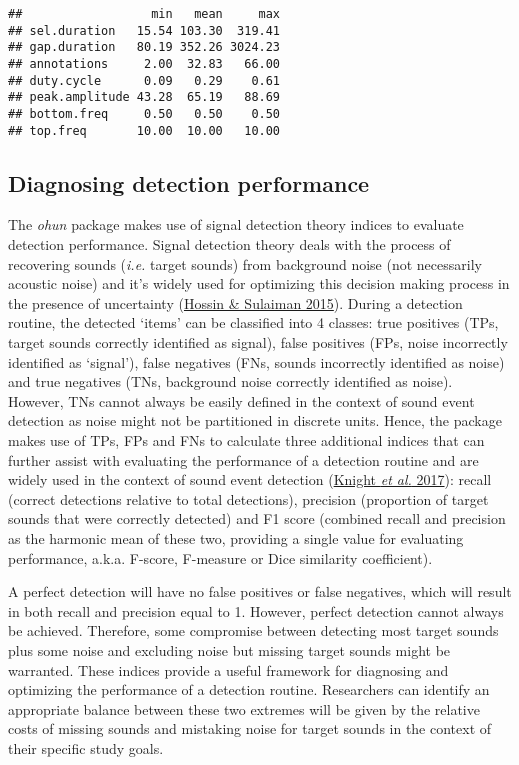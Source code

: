 \documentclass[
]{article}
\begin{document}
\begin{verbatim}
##                  min   mean     max
## sel.duration   15.54 103.30  319.41
## gap.duration   80.19 352.26 3024.23
## annotations     2.00  32.83   66.00
## duty.cycle      0.09   0.29    0.61
## peak.amplitude 43.28  65.19   88.69
## bottom.freq     0.50   0.50    0.50
## top.freq       10.00  10.00   10.00
\end{verbatim}

\hypertarget{diagnosing-detection-performance}{%
\subsection{Diagnosing detection
performance}\label{diagnosing-detection-performance}}

The \emph{ohun} package makes use of signal detection theory indices to
evaluate detection performance. Signal detection theory deals with the
process of recovering sounds (\emph{i.e.} target sounds) from background
noise (not necessarily acoustic noise) and it's widely used for
optimizing this decision making process in the presence of uncertainty
(\protect\hyperlink{ref-hossin2015}{Hossin \& Sulaiman 2015}). During a
detection routine, the detected `items' can be classified into 4
classes: true positives (TPs, target sounds correctly identified as
signal), false positives (FPs, noise incorrectly identified as
`signal'), false negatives (FNs, sounds incorrectly identified as noise)
and true negatives (TNs, background noise correctly identified as
noise). However, TNs cannot always be easily defined in the context of
sound event detection as noise might not be partitioned in discrete
units. Hence, the package makes use of TPs, FPs and FNs to calculate
three additional indices that can further assist with evaluating the
performance of a detection routine and are widely used in the context of
sound event detection (\protect\hyperlink{ref-knight2017}{Knight
\emph{et al.} 2017}): recall (correct detections relative to total
detections), precision (proportion of target sounds that were correctly
detected) and F1 score (combined recall and precision as the harmonic
mean of these two, providing a single value for evaluating performance,
a.k.a. F-score, F-measure or Dice similarity coefficient).

A perfect detection will have no false positives or false negatives,
which will result in both recall and precision equal to 1. However,
perfect detection cannot always be achieved. Therefore, some compromise
between detecting most target sounds plus some noise and excluding noise
but missing target sounds might be warranted. These indices provide a
useful framework for diagnosing and optimizing the performance of a
detection routine. Researchers can identify an appropriate balance
between these two extremes will be given by the relative costs of
missing sounds and mistaking noise for target sounds in the context of
their specific study goals.
\end{document}
